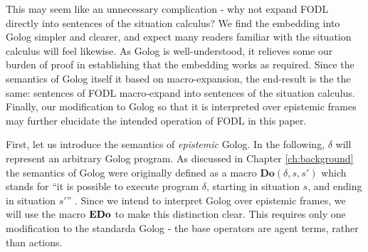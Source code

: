 This may seem like an unnecessary complication - why not expand FODL
directly into sentences of the situation calculus? We find the embedding
into Golog simpler and clearer, and expect many readers familiar with
the situation calculus will feel likewise. As Golog is well-understood,
it relieves some our burden of proof in establishing that the embedding
works as required. Since the semantics of Golog itself it based on
macro-expansion, the end-result is the the same: sentences of FODL
macro-expand into sentences of the situation calculus. Finally, our
modification to Golog so that it is interpreted over epistemic frames
may further elucidate the intended operation of FODL in this paper.

First, let us introduce the semantics of \emph{epistemic }Golog. In
the following, $\delta$ will represent an arbitrary Golog program.
As discussed in Chapter \ref{ch:background} the semantics of Golog
were originally defined as a macro $\mathbf{Do}(\delta,s,s')$ which
stands for {}``it is possible to execute program $\delta$, starting
in situation $s$, and ending in situation $s'$'' \citep{levesque97golog}.
Since we intend to interpret Golog over epistemic frames, we will
use the macro $\mathbf{EDo}$ to make this distinction clear. This requires
only one modification to the standarda Golog - the base operators
are agent terms, rather than actions.

